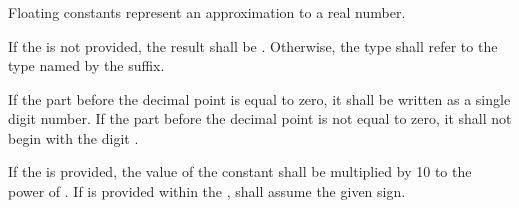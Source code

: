 \begin{grammar}
 \exactly \\
	     \\
	   \\

 \oneof \\
	 \\

 \exactly \\
	  \\

 \oneof \\
	 \\

 \exactly \\
	   \\

 \oneof \\
        \terminal{+}
        \terminal{-} \\

 \oneof \\
         \\
\end{grammar}

Floating constants represent an approximation to a real number.

\specsubitem
If the  is not provided, the result shall be
. Otherwise, the type shall refer to the type named by the
suffix.

\specsubitem
If the part before the decimal point is equal to zero, it shall be written as a
single digit number. If the part before the decimal point is not equal to zero,
it shall not begin with the digit .

\specsubitem
If the  is provided, the value of the
constant shall be multiplied by 10 to the power of
. If  is provided within the
,  shall assume the given
sign.

